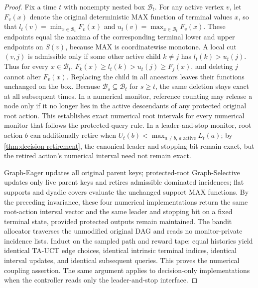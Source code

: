 \documentclass{article}
\theoremstyle{plain}
\theoremstyle{definition}
\begin{document}
\begin{proof}
Fix a time $t$ with nonempty nested box $\mathcal B_t$. For any active vertex $v$, let $F_v(x)$ denote the original deterministic MAX function of terminal values $x$, so that $l_t(v)=\min_{x\in\mathcal B_t}F_v(x)$ and $u_t(v)=\max_{x\in\mathcal B_t}F_v(x)$. These endpoints equal the maxima of the corresponding terminal lower and upper endpoints on $S(v)$, because MAX is coordinatewise monotone. A local cut $(v,j)$ is admissible only if some other active child $k\ne j$ has $l_t(k)>u_t(j)$. Thus for every $x\in\mathcal B_t$, $F_k(x)\ge l_t(k)>u_t(j)\ge F_j(x)$, and deleting $j$ cannot alter $F_v(x)$. Replacing the child in all ancestors leaves their functions unchanged on the box. Because $\mathcal B_s\subseteq\mathcal B_t$ for $s\ge t$, the same deletion stays exact at all subsequent times. In a numerical monitor, reference counting may release a node only if it no longer lies in the active descendants of any protected original root action. This establishes exact numerical root intervals for every numerical monitor that follows the protected-query rule. In a leader-and-stop monitor, root action $b$ can additionally retire when $U_t(b)<\max_{a\ne b,\,a\text{ active}}L_t(a)$; by \cref{thm:decision-retirement}, the canonical leader and stopping bit remain exact, but the retired action's numerical interval need not remain exact.

Graph-Eager updates all original parent keys; protected-root Graph-Selective updates only live parent keys and retires admissible dominated incidences; flat supports and dyadic covers evaluate the unchanged support MAX functions. By the preceding invariance, these four numerical implementations return the same root-action interval vector and the same leader and stopping bit on a fixed terminal state, provided protected outputs remain maintained. The bandit allocator traverses the unmodified original DAG and reads no monitor-private incidence lists. Induct on the sampled path and reward tape: equal histories yield identical TA-UCT edge choices, identical intrinsic terminal indices, identical interval updates, and identical subsequent queries. This proves the numerical coupling assertion. The same argument applies to decision-only implementations when the controller reads only the leader-and-stop interface.


\end{proof}
\end{document}
